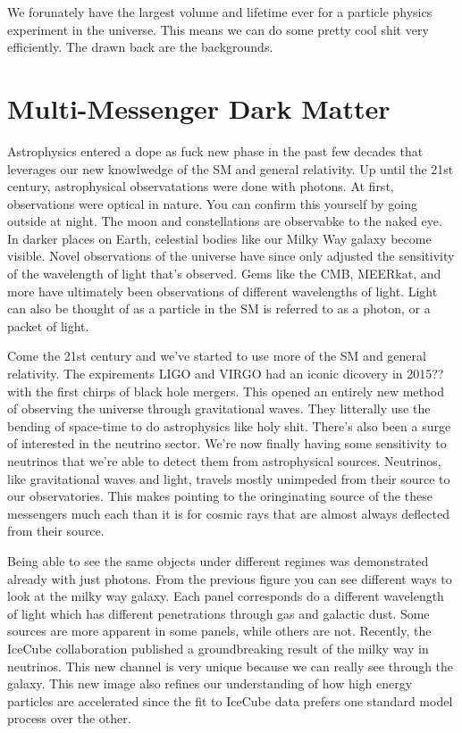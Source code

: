 
We forunately have the largest volume and lifetime ever for a particle physics experiment in the universe.
This means we can do some pretty cool shit very efficiently.
The drawn back are the backgrounds.
\section{Multi-Messenger Dark Matter \label{sec:mult-messengerDM}}

Astrophysics entered a dope as fuck new phase in the past few decades that leverages our new knowlwedge of the SM and general relativity.
Up until the 21st century, astrophysical observatations were done with photons.
At first, observations were optical in nature.
You can confirm this yourself by going outside at night.
The moon and constellations are observabke to the naked eye.
In darker places on Earth, celestial bodies like our Milky Way galaxy become visible.
Novel observations of the universe have since only adjusted the sensitivity of the wavelength of light that's observed.
Gems like the CMB, MEERkat, \ns and more have ultimately been observations of different wavelengths of light.
Light can also be thought of as a particle in the SM is referred to as a photon, or a packet of light.


Come the 21st century and we've started to use more of the SM and general relativity.
The expirements LIGO and VIRGO had an iconic dicovery in 2015??\fu with the first chirps of black hole mergers.
This opened an entirely new method of observing the universe through gravitational waves.
They litterally use the bending of space-time to do astrophysics like holy shit.
There's also been a surge of interested in the neutrino sector.
We're now finally having some sensitivity to neutrinos that we're able to detect them from astrophysical sources.
Neutrinos, like gravitational waves and light, travels mostly unimpeded from their source to our observatories.
This makes pointing to the oringinating source of the these messengers much each than it is for cosmic rays that are almost always deflected from their source.


Being able to see the same objects under different regimes was demonstrated already with just photons.
From the previous figure you can see different ways to look at the milky way galaxy.
Each panel corresponds do a different wavelength of light which has different penetrations through gas and galactic dust.
Some sources are more apparent in some panels, while others are not.
Recently, the IceCube collaboration published a groundbreaking result of the milky way in neutrinos.
This new channel is very unique because we can really see through the galaxy.
This new image also refines our understanding of how high energy particles are accelerated since the fit to IceCube data prefers one standard model process over the other.

